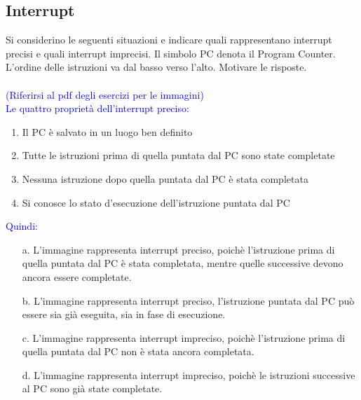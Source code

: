\documentclass[12pt]{article}
\begin{document}
\subsection{Interrupt}
Si considerino le seguenti situazioni e indicare quali rappresentano interrupt precisi e quali interrupt
imprecisi. Il simbolo PC denota il Program Counter. L'ordine delle istruzioni va dal basso verso
l'alto. Motivare le risposte.\\\\
\textcolor{blue}{(Riferirsi al pdf degli esercizi per le immagini)}\\
\textcolor{blue}{Le quattro proprietà dell'interrupt preciso:}
\begin{enumerate}
    \color{blue}
    \item Il PC è salvato in un luogo ben definito
    \item Tutte le istruzioni prima di quella puntata dal PC sono state completate
    \item Nessuna istruzione dopo quella puntata dal PC è stata completata
    \item Si conosce lo stato d'esecuzione dell'istruzione puntata dal PC
\end{enumerate}
\textcolor{blue}{Quindi:}
\begin{itemize}
    \color{blue}
    \item [a.] L'immagine rappresenta interrupt preciso, poichè l'istruzione prima di quella puntata dal PC è stata completata, mentre quelle successive devono ancora essere completate.
    \item [b.] L'immagine rappresenta interrupt preciso, l'istruzione puntata dal PC può essere sia già eseguita, sia in fase di esecuzione.
    \item [c.] L'immagine rappresenta interrupt impreciso, poichè l'istruzione prima di quella puntata dal PC non è stata ancora completata.
    \item [d.] L'immagine rappresenta interrupt impreciso, poichè le istruzioni successive al PC sono già state completate.
\end{itemize}
\end{document}
